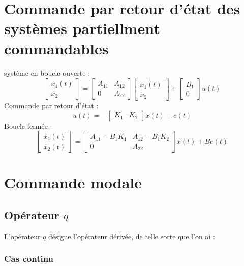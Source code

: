 {{{\section{Commande par retour d'état des systèmes partiellment commandables}
\large{système en boucle ouverte :}
\[
\begin{bmatrix}
   \dot{x_{1}}(t) \\
   \dot{x_{2}} 
\end{bmatrix}
 = 
\begin{bmatrix}
    A_{11} & A_{12} \\
    0      & A_{22}
\end{bmatrix}
\begin{bmatrix}
    \dot{x_{1}(t)} \\
    \dot{x_{2}} 
\end{bmatrix}
+
\begin{bmatrix}
    B_{1} \\
    0
\end{bmatrix}
u(t)
\]
\large{Commande par retour d'état :}\newline
\[ u(t) = 
 - \begin{bmatrix}
   K_{1} & K_{2}
\end{bmatrix}
x(t) + e(t)
\]
\large{Boucle fermée :} \newline
\[
\begin{bmatrix}
   \dot{x_{1}}(t) \\
   \dot{x_{2}}(t) 
\end{bmatrix}
 = 
\begin{bmatrix}
    A_{11} - B_{1}K_{1} & A_{12} - B_{1}K_{2} \\
    0                   & A_{22}
\end{bmatrix}
x(t) + Be(t)
\]
\newpage
\section{Commande modale}
\subsection{Opérateur $q$}
\large{L'opérateur $q$ désigne l'opérateur dérivée, de telle sorte que l'on ai :}
\subsubsection{Cas continu}
\begin{center}
    \Large{}
\end{center}
}}}

